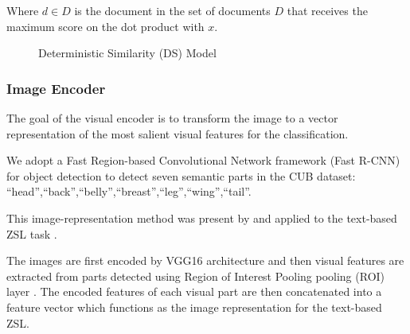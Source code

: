\documentclass[11pt,a4paper]{article}
\begin{document}
Where $d\in D$ is the document in the set of documents $D$ that receives the maximum score on the dot product with $x$. 



\begin{figure}[t]
\centering
{}
 \caption{Deterministic Similarity (DS) Model}
\label{fig:DS}
\end{figure}

\subsubsection{Image Encoder}
\label{section:Image_Encoder}
The goal of the visual encoder is to transform the image to a vector representation of the most salient visual features for the classification.\par

We adopt a 
Fast Region-based Convolutional Network framework (Fast R-CNN) for object detection   \citep{girshick2015fast} to detect seven semantic parts in the CUB dataset:
\enquote{head},\enquote{back},\enquote{belly},\enquote{breast},\enquote{leg},\enquote{wing},\enquote{tail}.\par
This image-representation method was present by \citet{zhang2016spda} and applied to the text-based ZSL task \cite{zhu2018generative,elhoseiny2017link} . \par

The images are first encoded by VGG16 architecture \citep{simonyan2014very} and then visual features are extracted from parts detected using Region of Interest Pooling pooling (ROI) layer \citep{girshick2015fast}. %
The encoded features of each visual part are then concatenated into a feature vector which functions as the image representation for the text-based ZSL.
\end{document}
